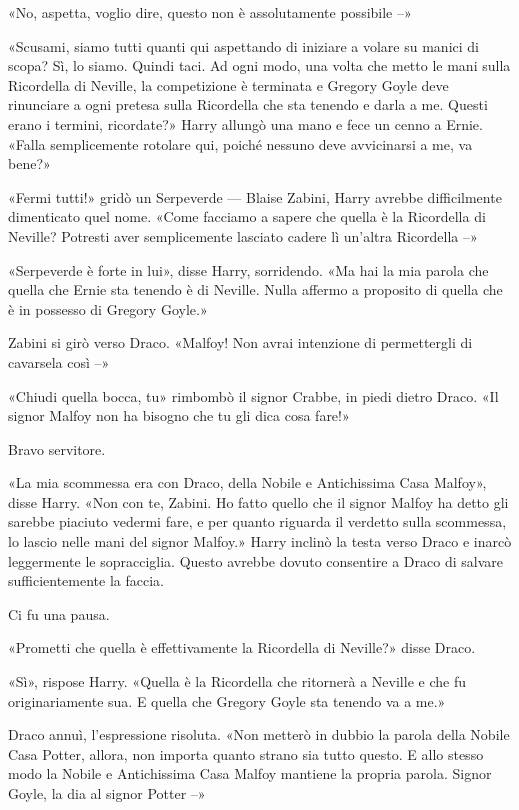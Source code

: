 «No, aspetta, voglio dire, questo non è assolutamente possibile –»

«Scusami, siamo tutti quanti qui aspettando di iniziare a volare su manici di scopa? Sì, lo siamo. Quindi taci. Ad ogni modo, una volta che metto le mani sulla Ricordella di Neville, la competizione è terminata e Gregory Goyle deve rinunciare a ogni pretesa sulla Ricordella che sta tenendo e darla a me. Questi erano i termini, ricordate?» Harry allungò una mano e fece un cenno a Ernie. «Falla semplicemente rotolare qui, poiché nessuno deve avvicinarsi a me, va bene?»

«Fermi tutti!» gridò un Serpeverde — Blaise Zabini, Harry avrebbe difficilmente dimenticato quel nome. «Come facciamo a sapere che quella è la Ricordella di Neville? Potresti aver semplicemente lasciato cadere lì un’altra Ricordella –»

«Serpeverde è forte in lui», disse Harry, sorridendo. «Ma hai la mia parola che quella che Ernie sta tenendo è di Neville. Nulla affermo a proposito di quella che è in possesso di Gregory Goyle.»

Zabini si girò verso Draco. «Malfoy! Non avrai intenzione di permettergli di cavarsela così –»

«Chiudi quella bocca, tu» rimbombò il signor Crabbe, in piedi dietro Draco. «Il signor Malfoy non ha bisogno che tu gli dica cosa fare!»

Bravo servitore.

«La mia scommessa era con Draco, della Nobile e Antichissima Casa Malfoy», disse Harry. «Non con te, Zabini. Ho fatto quello che il signor Malfoy ha detto gli sarebbe piaciuto vedermi fare, e per quanto riguarda il verdetto sulla scommessa, lo lascio nelle mani del signor Malfoy.» Harry inclinò la testa verso Draco e inarcò leggermente le sopracciglia. Questo avrebbe dovuto consentire a Draco di salvare sufficientemente la faccia.

Ci fu una pausa.

«Prometti che quella è effettivamente la Ricordella di Neville?» disse Draco.

«Sì», rispose Harry. «Quella è la Ricordella che ritornerà a Neville e che fu originariamente sua. E quella che Gregory Goyle sta tenendo va a me.»

Draco annuì, l’espressione risoluta. «Non metterò in dubbio la parola della Nobile Casa Potter, allora, non importa quanto strano sia tutto questo. E allo stesso modo la Nobile e Antichissima Casa Malfoy mantiene la propria parola. Signor Goyle, la dia al signor Potter –»

